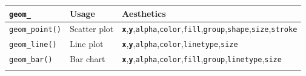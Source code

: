 \documentclass[]{book}
\begin{document}
\begin{longtable}[]{@{}lll@{}}
\toprule
\begin{minipage}[b]{0.13\columnwidth}\raggedright\strut
\texttt{geom\_}\strut
\end{minipage} & \begin{minipage}[b]{0.14\columnwidth}\raggedright\strut
Usage\strut
\end{minipage} & \begin{minipage}[b]{0.64\columnwidth}\raggedright\strut
Aesthetics\strut
\end{minipage}\tabularnewline
\midrule
\endhead
\begin{minipage}[t]{0.13\columnwidth}\raggedright\strut
\texttt{geom\_point()}\strut
\end{minipage} & \begin{minipage}[t]{0.14\columnwidth}\raggedright\strut
Scatter plot\strut
\end{minipage} & \begin{minipage}[t]{0.64\columnwidth}\raggedright\strut
\textbf{\texttt{x}},\textbf{\texttt{y}},\texttt{alpha},\texttt{color},\texttt{fill},\texttt{group},\texttt{shape},\texttt{size},\texttt{stroke}\strut
\end{minipage}\tabularnewline
\begin{minipage}[t]{0.13\columnwidth}\raggedright\strut
\texttt{geom\_line()}\strut
\end{minipage} & \begin{minipage}[t]{0.14\columnwidth}\raggedright\strut
Line plot\strut
\end{minipage} & \begin{minipage}[t]{0.64\columnwidth}\raggedright\strut
\textbf{\texttt{x}},\textbf{\texttt{y}},\texttt{alpha},\texttt{color},\texttt{linetype},\texttt{size}\strut
\end{minipage}\tabularnewline
\begin{minipage}[t]{0.13\columnwidth}\raggedright\strut
\texttt{geom\_bar()}\strut
\end{minipage} & \begin{minipage}[t]{0.14\columnwidth}\raggedright\strut
Bar chart\strut
\end{minipage} & \begin{minipage}[t]{0.64\columnwidth}\raggedright\strut
\textbf{\texttt{x}},\textbf{\texttt{y}},\texttt{alpha},\texttt{color},\texttt{fill},\texttt{group},\texttt{linetype},\texttt{size}\strut
\end{minipage}\tabularnewline
\begin{minipage}[t]{0.13\columnwidth}\raggedright\strut

\end{minipage}
\end{longtable}
\end{document}
